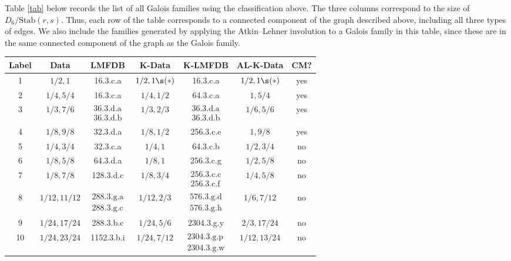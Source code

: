 \documentclass[12pt]{amsart}
\theoremstyle{definition}
\theoremstyle{remark}
\begin{document}
Table \ref{tab} below records the list of all Galois families using the classification above.  The three columns correspond to the size of $D_6/\text{Stab}(r,s)$. Thus, each row of the table corresponds to a connected component of the graph described above, including all three types of edges.  We also include the families generated by applying the Atkin--Lehner involution to a Galois family in this table, since these are in the same connected component of the graph as the Galois family.



 

\begin{table}[ht]
   \begin{center}
     \begin{tabular}{c|cc|cc|c|c}
       Label & Data & LMFDB & K-Data & K-LMFDB&AL-K-Data& CM? \\\hline
        1 & $1/2,1$ & 16.3.c.a & $1/2,1\s (*)$ & 16.3.c.a &$1/2,1\s (*)$& yes\\\hline
        2& $1/4,5/4$ & 16.3.c.a & $1/4,1/2$ & 64.3.c.a & $1,5/4$ & yes\\\hline
         3&  $1/3,7/6$ & $\begin{array}{c} \text{36.3.d.a}\\\text{36.3.d.b} \end{array}$ &$1/3,2/3$ & $\begin{array}{c} \text{36.3.d.a}\\\text{36.3.d.b} \end{array}$ & $1/6, 5/6$ & yes\\\hline
          4& $1/8,9/8$ & 32.3.d.a & $1/8,1/2$ & 256.3.c.e & $1,9/8$ & yes\\\hline
       5 & $1/4,3/4$ & 32.3.c.a & $1/4,1$ & 64.3.c.b& $1/2,3/4$ & no \\\hline
       6& $1/8,5/8$ & 64.3.d.a & $1/8,1$ & 256.3.c.g & $1/2,5/8$ & no \\\hline
       7& $1/8,7/8$ & 128.3.d.c & $1/8,3/4$ & $\begin{array}{c} \text{256.3.c.c}\\\text{256.3.c.f} \end{array}$& $1/4,5/8$ & no\\\hline

         8& $1/12,11/12$ & $\begin{array}{c} \text{288.3.g.a}\\\text{288.3.g.c} \end{array}$ & $1/12,2/3$ & $\begin{array}{c} \text{576.3.g.d}\\\text{576.3.g.h} \end{array}$& $1/6,7/12$ & no\\\hline
          9& $1/24, 17/24$ & 288.3.b.c & $1/24, 5/6$ & 2304.3.g.y& $2/3,17/24$ & no\\\hline
       10& $1/24,23/24$ & 1152.3.b.i & $1/24,7/12$ & $\begin{array}{c} \text{2304.3.g.p}\\\text{2304.3.g.w} \end{array}$ & $1/12,13/24$ &  no\\
      

\end{tabular}
\end{center}
\end{table}
\end{document}
